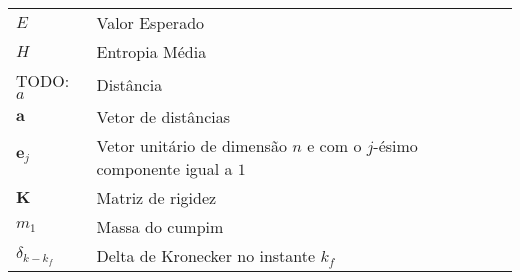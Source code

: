 \begin{longtable}{ll}

$E$ & Valor Esperado\\
$H$ & Entropia Média\\

TODO: 
$a$ & Distância\\
$\textbf{a}$ & Vetor de distâncias\\
$\textbf{e}_{j}$ & Vetor unitário de dimensão $n$ e com o $j$-ésimo componente igual a $1$ \\
$\textbf{K}$ & Matriz de rigidez\\
$m_1$ & Massa do cumpim\\
$\delta_{k-k_f}$ & Delta de Kronecker no instante $k_f$\\

\end{longtable}

